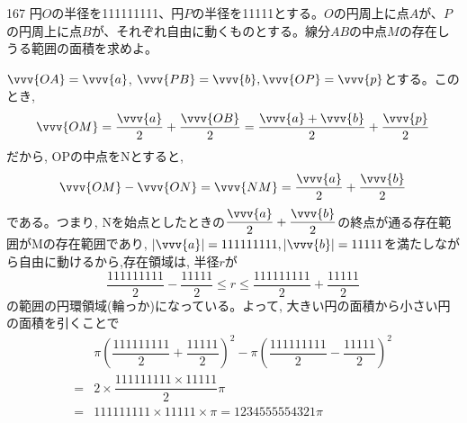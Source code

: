 \begin{prob}{167}{}{}
 円$O$の半径を111111111、円$P$の半径を11111とする。$O$の円周上に点$A$が、$P$の円周上に点$B$が、それぞれ自由に動くものとする。線分$AB$の中点$M$の存在しうる範囲の面積を求めよ。 
\end{prob}

$\vvv{OA}=\vvv{a}$, $\vvv{PB}=\vvv{b}, \vvv{OP}=\vvv{p}$とする。このとき,
\[\vvv{OM}=\dfrac{\vvv{a}}{2}+\dfrac{\vvv{OB}}{2}=\dfrac{\vvv{a}+\vvv{b}}{2}+\dfrac{\vvv{p}}{2}\]
だから, OPの中点をNとすると, 
\[\vvv{OM}-\vvv{ON}=\vvv{NM}=\dfrac{\vvv{a}}{2}+\dfrac{\vvv{b}}{2}\]
である。つまり, Nを始点としたときの$\dfrac{\vvv{a}}{2}+\dfrac{\vvv{b}}{2}$の終点が通る存在範囲がMの存在範囲であり, $|\vvv{a}|=111111111, |\vvv{b}|=11111$を満たしながら自由に動けるから,存在領域は, 半径$r$が
\[\dfrac{111111111}{2}-\dfrac{11111}{2}\leq r\leq \dfrac{111111111}{2}+\dfrac{11111}{2}\]
の範囲の円環領域(輪っか)になっている。よって, 大きい円の面積から小さい円の面積を引くことで
\begin{align*}
&\pi\left(\dfrac{111111111}{2}+\dfrac{11111}{2}\right)^2 -\pi\left(\dfrac{111111111}{2}-\dfrac{11111}{2}\right)^2\\
=&2\times \dfrac{111111111\times 11111}{2} \pi\\
=& 111111111\times 11111\times \pi=1234555554321\pi
\end{align*}